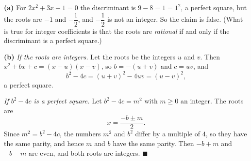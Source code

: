 \textbf{(a)} For $2x^2+3x+1=0$ the discriminant is $9-8=1=1^2$, a perfect square, but the roots are $-1$ and $-\dfrac12$, and $-\dfrac12$ is not an integer. So the claim is false. (What is true for integer coefficients is that the roots are \emph{rational} if and only if the discriminant is a perfect square.)

\textbf{(b)} \emph{If the roots are integers.} Let the roots be the integers $u$ and $v$. Then $x^2+bx+c=(x-u)(x-v)$, so $b=-(u+v)$ and $c=uv$, and
\[b^2-4c=(u+v)^2-4uv=(u-v)^2,\]
a perfect square.

\emph{If $b^2-4c$ is a perfect square.} Let $b^2-4c=m^2$ with $m\ge0$ an integer. The roots are
\[x=\dfrac{-b\pm m}{2}.\]
Since $m^2=b^2-4c$, the numbers $m^2$ and $b^2$ differ by a multiple of $4$, so they have the same parity, and hence $m$ and $b$ have the same parity. Then $-b+m$ and $-b-m$ are even, and both roots are integers. $\blacksquare$
